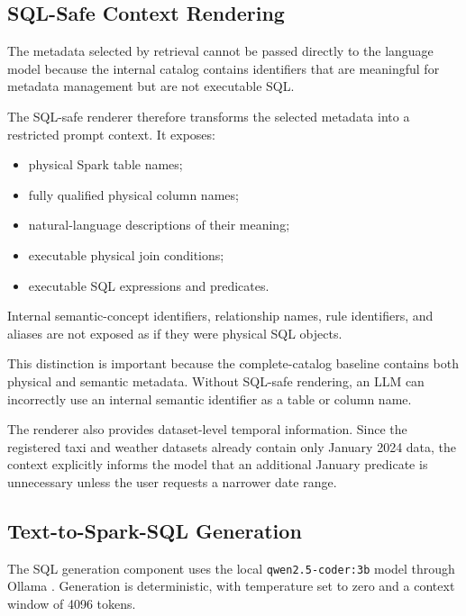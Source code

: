 \subsection{SQL-Safe Context Rendering}

The metadata selected by retrieval cannot be passed directly to the language
model because the internal catalog contains identifiers that are meaningful
for metadata management but are not executable SQL.

The SQL-safe renderer therefore transforms the selected metadata into a
restricted prompt context. It exposes:

\begin{itemize}

    \item physical Spark table names;

    \item fully qualified physical column names;

    \item natural-language descriptions of their meaning;

    \item executable physical join conditions;

    \item executable SQL expressions and predicates.

\end{itemize}

Internal semantic-concept identifiers, relationship names, rule identifiers,
and aliases are not exposed as if they were physical SQL objects.

This distinction is important because the complete-catalog baseline contains
both physical and semantic metadata. Without SQL-safe rendering, an LLM can
incorrectly use an internal semantic identifier as a table or column name.

The renderer also provides dataset-level temporal information. Since the
registered taxi and weather datasets already contain only January 2024 data,
the context explicitly informs the model that an additional January predicate
is unnecessary unless the user requests a narrower date range.


\subsection{Text-to-Spark-SQL Generation}

The SQL generation component uses the local
\texttt{qwen2.5-coder:3b} model through Ollama \cite{hui2024qwen25coder}. Generation is deterministic,
with temperature set to zero and a context window of 4096 tokens.

